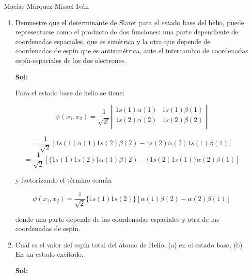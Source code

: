 \documentclass[12pt,a4paper]{article}
\begin{document}
Macías Márquez Misael Iván

\begin{enumerate}






\item Demuestre que el determinante de Slater para el estado base del helio, puede representarse como el producto de dos funciones: una parte dependiente de coordenadas espaciales, que es simétrica y la otra que depende de coordenadas de espín que es antisimétrica, ante el intercambio de coordenadas espín-espaciales de los dos electrones.


\textbf{Sol:}

Para el estado base de helio se tiene:

\begin{equation*}
    \psi (x_1,x_2) = \frac{1}{\sqrt{2!}} \left|\begin{matrix}
    1s (1) \alpha(1) & 1s (1) \beta(1)  \\
    1s(2) \alpha(2) & 1s(2) \beta(2)  \\

    \end{matrix}\right|
\end{equation*}

\begin{equation*}
    = \frac{1}{\sqrt{2}} [1s (1) \alpha(1) 1s (2) \beta(2) - 1s (2) \alpha (2) 1s (1) \beta(1)]
\end{equation*}
\begin{equation*}
    =\frac{1}{\sqrt{2}} [\{1s (1) 1s (2)\} \alpha(1)  \beta(2) - \{1s (2)1s (1)\} \alpha (2)  \beta(1)]
\end{equation*}

y factorizando el término común

\begin{equation*}
    \psi (x_1,x_2) = \frac{1}{\sqrt{2}}\{1s (1) 1s (2)\}  [\alpha(1)  \beta(2) - \alpha (2)  \beta(1)]
\end{equation*}

donde una parte depende de las coordenadas espaciales y otra de las coordenadas de espín.





\item Cuál es el valor del espín total del átomo de Helio, (a) en el estado base, (b) En un estado excitado.

\textbf{Sol:}










\end{enumerate}
\end{document}
